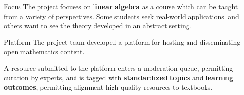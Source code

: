 \begin{sectionblock}{Focus}
  The project focuses on \textbf{linear algebra} as a course which can
  be taught from a variety of perspectives.  Some students seek
  real-world applications, and others want to see the theory developed
  in an abstract setting.
\end{sectionblock}

\begin{sectionblock}{Platform}
  The project team developed a platform for hosting and disseminating
  open mathematics content.

  \vspace{1ex}
  A resource submitted to the platform enters a moderation queue,
  permitting curation by experts, and is tagged with
  \textbf{standardized topics} and \textbf{learning outcomes},
  permitting alignment high-quality resources to textbooks.
\end{sectionblock}